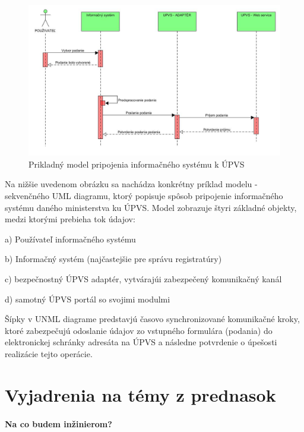 \documentclass[10pt,twoside,slovak,a4paper]{article}
\begin{document}
\begin{figure}[h!]
\centering
\includegraphics[width=\textwidth]{Images/Obr3.jpg}
\caption{Prikladný model pripojenia informačného systému k ÚPVS\cite{UMLetJa}}
\label{Model}
\end{figure}

Na nižšie uvedenom obrázku sa nachádza konkrétny príklad modelu - sekvenčného UML diagramu, ktorý popisuje spôsob pripojenie informačného systému daného ministerstva ku ÚPVS. Model zobrazuje štyri základné objekty, medzi ktorými prebieha tok údajov:
\begin{description}
\item a)        Používateľ informačného systému
\item b)        Informačný systém (najčastejšie pre správu registratúry)
\item c)        bezpečnostný ÚPVS adaptér, vytvárajúi zabezpečený komunikačný kanál
\item d)        samotný ÚPVS portál so svojimi modulmi
\end{description}
Šípky v UNML diagrame predstavjú časovo synchronizované komunikačné kroky, ktoré zabezpečujú odoslanie údajov zo vstupného formulára (podania) do elektronickej schránky adresáta na ÚPVS a následne potvrdenie o úpešosti realizácie tejto operácie.\newline




\section{Vyjadrenia na témy z prednasok} \label{5sek}


\paragraph{Na co budem inžinierom?}
\end{document}
